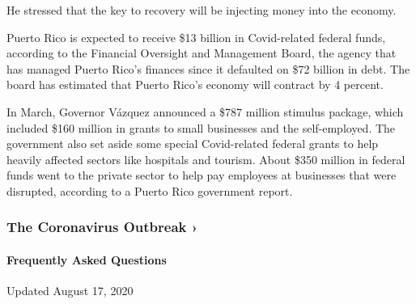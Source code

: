 He stressed that the key to recovery will be injecting money into the
economy.

Puerto Rico is expected to receive \$13 billion in Covid-related federal
funds, according to the Financial Oversight and Management Board, the
agency that has managed Puerto Rico's finances since it defaulted on
\$72 billion in debt. The board has estimated that Puerto Rico's economy
will contract by 4 percent.

In March, Governor Vázquez announced a \$787 million stimulus package,
which included \$160 million in grants to small businesses and the
self-employed. The government also set aside some special Covid-related
federal grants to help heavily affected sectors like hospitals and
tourism. About \$350 million in federal funds went to the private sector
to help pay employees at businesses that were disrupted, according to a
Puerto Rico government report.

\href{https://www.nytimes3xbfgragh.onion/news-event/coronavirus?action=click\&pgtype=Article\&state=default\&region=MAIN_CONTENT_3\&context=storylines_faq}{}

\hypertarget{the-coronavirus-outbreak-}{%
\subsubsection{The Coronavirus Outbreak
›}\label{the-coronavirus-outbreak-}}

\hypertarget{frequently-asked-questions}{%
\paragraph{Frequently Asked
Questions}\label{frequently-asked-questions}}

Updated August 17, 2020

